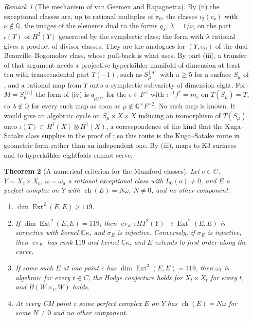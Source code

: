 \documentclass[11pt,reqno]{amsart}
\theoremstyle{plain}
\newtheorem{theorem}{Theorem}[section]
\theoremstyle{definition}
\theoremstyle{remark}
\newtheorem{remark}[theorem]{Remark}
\newcommand{\QQ}{\mathbb{Q}}
\newcommand{\CC}{\mathbb{C}}
\DeclareMathOperator{\ch}{ch}
\DeclareMathOperator{\Ext}{Ext}
\begin{document}
\begin{remark}[The mechanism of van Geemen and
Rapagnetta]\label{rem:hkroute}
By (ii) the exceptional classes are, up to rational
multiples of $\pi_{0}$, the classes $\iota_{2}(c_{\nu})$ with $\nu\notin\QQ$,
the images of the elements dual to the forms $q_{\lambda}$, $\lambda=1/\nu$,
on the part $\iota(T)$ of $H^{2}(Y)$ generated by the symplectic class; the
form with $\lambda$ rational gives a product of divisor classes. They are the
analogues for $(Y,\sigma_{0})$ of the dual Beauville--Bogomolov class, whose
pull-back is what \cite{vGR26} uses. By part (iii), a transfer of that
argument needs a projective hyperk\"ahler manifold of dimension at least ten with
transcendental part $T(-1)$, such as $S_{\mu}^{[n]}$ with $n\ge5$ for a
surface $S_{\mu}$ of , and a rational map from $Y$ onto a
symplectic subvariety of dimension eight. For $M=S_{\mu}^{[n]}$ the form of
(iv) is $q_{\mu/e^{2}}$ for the $e\in F^{\times}$ with $\iota^{-1}f^{*}=m_{e}$
on $T(S_{\mu})=T$, so $\lambda\notin\QQ$ for every such map as soon as
$\mu\notin\QQ^{\times}F^{\times2}$. No such map is known. It would give an
algebraic cycle on $S_{\mu}\times X\times X$ inducing an isomorphism of
$T(S_{\mu})$ onto $\iota(T)\subset H^{1}(X)\otimes H^{1}(X)$, a correspondence
of the kind that the Kuga--Satake class supplies in the proof of
; so this route is the Kuga--Satake route in geometric
form rather than an independent one. By (iii), maps to K3 surfaces and to
hyperk\"ahler eightfolds cannot serve.
\end{remark}

\begin{theorem}[A numerical criterion for the Mumford classes]
\label{thm:mumfordnumerical}
Let $c\in C$, $Y=X_{c}\times X_{c}$, $\omega=\omega_{a}$ a rational
exceptional class with $L_{0}(a)\ne0$, and $E$ a perfect complex on $Y$ with
$\ch(E)=N\omega$, $N\ne0$, and no other component.
\begin{enumerate}[label=\textup{(\roman*)},leftmargin=2.6em,itemsep=2pt]
\item $\dim\Ext^{2}(E,E)\ge119$.
\item If $\dim\Ext^{2}(E,E)=119$, then $\operatorname{ev}_{E}\colon
  HT^{2}(Y)\to\Ext^{2}(E,E)$ is surjective with kernel $\CC\kappa$, and
  $\sigma_{E}$ is injective. Conversely, if $\sigma_{E}$ is injective, then
  $\operatorname{ev}_{E}$ has rank $119$ and kernel $\CC\kappa$, and $E$
  extends to first order along the curve.
\item If some such $E$ at one point $c$ has $\dim\Ext^{2}(E,E)=119$, then
  $\omega_{t}$ is algebraic for every $t\in C$, the Hodge conjecture holds for
  $X_{t}\times X_{t}$ for every $t$, and $B(W\times_{C}W)$ holds.
\item At every CM point $c$ some perfect complex $E$ on $Y$ has
  $\ch(E)=N\omega$ for some $N\ne0$ and no other component.
\end{enumerate}
\end{theorem}
\end{document}
